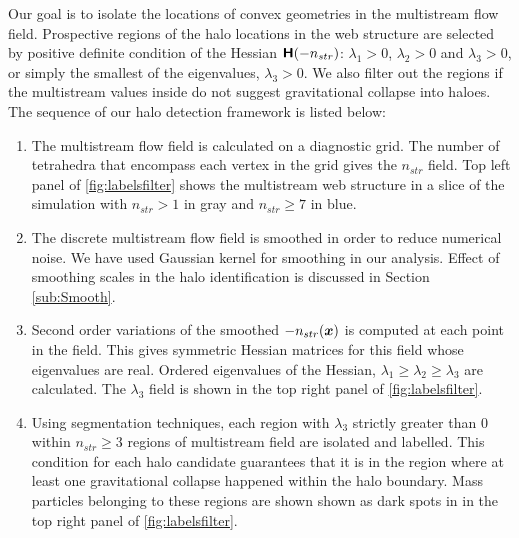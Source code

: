 \documentclass[fleqn,usenatbib,useAMS]{mnras}
\newcommand\ghl{\bgroup\markoverwith
  {\textcolor{green}{\rule[-.5ex]{2pt}{2.5ex}}}\ULon}
\begin{document}

{Our goal is to isolate the locations of convex geometries in the multistream flow field. Prospective regions of the halo locations in the web structure are selected by positive definite condition of the Hessian $\textbf{\textsf{H}}(-n_{str})$: $\lambda_1 > 0$, $\lambda_2 > 0$ and  $\lambda_3 > 0$, or simply the smallest of the eigenvalues, $\lambda_3 > 0$.
 We also filter out the regions if the multistream values inside do not suggest gravitational collapse into haloes. The sequence of our halo detection framework is listed below: 


\begin{enumerate}
\item The multistream flow field is calculated on a diagnostic grid. The number of tetrahedra that encompass each vertex in the grid gives the $n_{str}$ field. Top left panel of \autoref{fig:labelsfilter} shows the multistream web structure in a slice of the simulation with $n_{str} > 1$ in gray and $n_{str} \geq 7$ in blue.  

\item The discrete multistream flow field is smoothed in order to reduce numerical noise. We have used Gaussian kernel for smoothing in our analysis. Effect of smoothing scales in the halo identification is discussed in Section \ref{sub:Smooth}. 

\item Second order variations of the smoothed $-n_{str}(\bmath{x})$ is computed at each point in the field. This gives symmetric Hessian matrices for this field whose eigenvalues are real. Ordered eigenvalues of the Hessian, $ \lambda_1 \geq  \lambda_2 \geq \lambda_3$ are calculated. The $\lambda_3$ field is shown in the top right panel of \autoref{fig:labelsfilter}. 

\item Using segmentation techniques, each region with $ \lambda_3 $ strictly greater than $0$ within $n_{str} \geq 3$ regions of multistream field are isolated and labelled. This condition for each halo candidate guarantees that it is in the region where at least one gravitational collapse happened within the halo boundary. Mass particles belonging to these regions are shown shown as dark spots in in the top right panel of \autoref{fig:labelsfilter}. 


\end{enumerate}}
\end{document}
